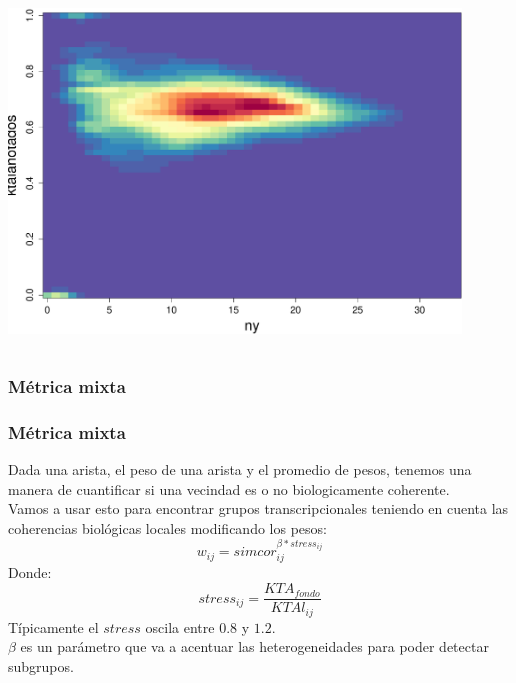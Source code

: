 \documentclass[serif,9pt, t]{beamer}
\begin{document}
\begin{frame}
\begin{columns}[T]
    \centering    
    \includegraphics[width=0.90\textwidth]{lktaanotados_vs_nyanotados.pdf}
\end{columns}
\end{frame}

\subsubsection*{Métrica mixta}
\begin{frame}\frametitle{Métrica mixta} 
Dada una arista, el peso de una arista y el promedio de pesos, tenemos una manera de cuantificar si una vecindad es o no biologicamente coherente.\\
\bigskip
Vamos a usar esto para encontrar grupos transcripcionales teniendo en cuenta las coherencias biológicas locales modificando los pesos:
\bigskip
\begin{equation}
	w_{ij} = simcor_{ij}^{\beta*stress_{ij}}
\end{equation}
Donde:
\begin{equation}
	stress_{ij} = \frac{KTA_{fondo}}{KTAl_{ij}}
\end{equation}
\bigskip
Típicamente el $stress$ oscila entre $0.8$ y $1.2$.\\
\bigskip
$\beta$ es un parámetro que va a acentuar las heterogeneidades para poder detectar subgrupos.
\end{frame}
\end{document}
